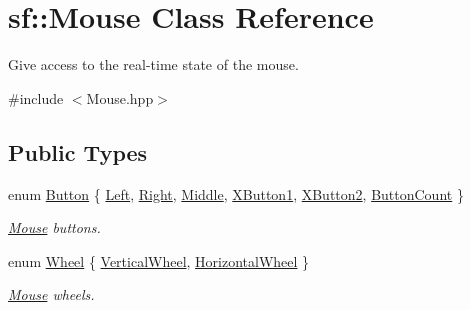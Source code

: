 \hypertarget{classsf_1_1_mouse}{}\section{sf\+:\+:Mouse Class Reference}
\label{classsf_1_1_mouse}


Give access to the real-\/time state of the mouse.  




{\ttfamily \#include $<$Mouse.\+hpp$>$}

\subsection*{Public Types}
\begin{DoxyCompactItemize}
\item 
enum \mbox{\hyperlink{classsf_1_1_mouse_a4fb128be433f9aafe66bc0c605daaa90}{Button}} \{ \newline
\mbox{\hyperlink{classsf_1_1_mouse_a4fb128be433f9aafe66bc0c605daaa90a8bb4856e1ec7f6b6a8605effdfc0eee8}{Left}}, 
\mbox{\hyperlink{classsf_1_1_mouse_a4fb128be433f9aafe66bc0c605daaa90af2cff24ab6c26daf079b11189f982fc4}{Right}}, 
\mbox{\hyperlink{classsf_1_1_mouse_a4fb128be433f9aafe66bc0c605daaa90a2c353189c4b11cf216d7caddafcc609d}{Middle}}, 
\mbox{\hyperlink{classsf_1_1_mouse_a4fb128be433f9aafe66bc0c605daaa90aecc7f3ce9ad6a60b9b0027876446b8d7}{X\+Button1}}, 
\newline
\mbox{\hyperlink{classsf_1_1_mouse_a4fb128be433f9aafe66bc0c605daaa90a03fa056fd0dd9d629c205d91a8ef1b5a}{X\+Button2}}, 
\mbox{\hyperlink{classsf_1_1_mouse_a4fb128be433f9aafe66bc0c605daaa90a52a1d434289774240ddaa22496762402}{Button\+Count}}
 \}
\begin{DoxyCompactList}\small\item\em \mbox{\hyperlink{classsf_1_1_mouse}{Mouse}} buttons. \end{DoxyCompactList}\item 
enum \mbox{\hyperlink{classsf_1_1_mouse_a60dd479a43f26f200e7957aa11803ff4}{Wheel}} \{ \mbox{\hyperlink{classsf_1_1_mouse_a60dd479a43f26f200e7957aa11803ff4abd571de908d2b2c4b9f165f29c678496}{Vertical\+Wheel}}, 
\mbox{\hyperlink{classsf_1_1_mouse_a60dd479a43f26f200e7957aa11803ff4a785768d5e33c77de9fdcfdd02219f4e2}{Horizontal\+Wheel}}
 \}
\begin{DoxyCompactList}\small\item\em \mbox{\hyperlink{classsf_1_1_mouse}{Mouse}} wheels. \end{DoxyCompactList}\end{DoxyCompactItemize}
